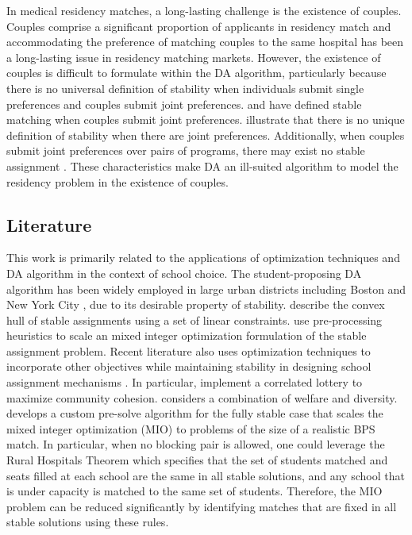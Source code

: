 \documentclass[11pt]{article}
\begin{document}
In medical residency matches, a long-lasting challenge is the existence of couples. Couples comprise a significant proportion of applicants in residency match and accommodating the preference of matching couples to the same hospital has been a long-lasting issue in residency matching markets. However, the existence of couples is difficult to formulate within the DA algorithm, particularly because there is no universal definition of stability when individuals submit single preferences and couples submit joint preferences. \cite{kojima2013} and \cite{mcdermid2010} have defined stable matching when couples submit joint preferences.  \cite{biro2013} illustrate that there is no unique definition of stability when there are joint preferences.
Additionally, when couples submit joint preferences over pairs of programs, there may exist no stable assignment \citep{roth2008}. 
These characteristics make DA an ill-suited algorithm to model the residency problem in the existence of couples. 

\subsection{Literature}
This work is primarily related to the applications of optimization techniques and DA algorithm in the context of school choice.
The student-proposing DA algorithm has been widely employed in large urban districts including Boston and New York City \citep{abdulkadirouglu2005nyc, abdulkadirouglu2005bos}, due to its desirable property of stability. 
\cite{baiou2000} describe the convex hull of stable assignments using a set of linear constraints. \cite{delorme2019} use pre-processing heuristics to scale an mixed integer optimization formulation of the stable assignment problem.
Recent literature also uses optimization techniques to incorporate other objectives while maintaining stability in designing school assignment mechanisms \citep{ashlagi2014, shi2015}. 
In particular, \cite{ashlagi2014} implement a correlated lottery to maximize community cohesion. \cite{bodoh2020} considers a combination of welfare and diversity.
\cite{papalexopoulos2022} develops a custom pre-solve algorithm for the fully stable case that scales the mixed integer optimization  (MIO) to problems of the size of a realistic BPS match. In particular, when no blocking pair is allowed, one could leverage the Rural Hospitals Theorem \citep{roth1986} which specifies that the set of students matched and seats filled at each school are the same in all stable solutions, and any school that is under capacity is matched to the same set of students. Therefore, the MIO problem can be reduced significantly by identifying matches that are fixed in all stable solutions using these rules. 
\end{document}
